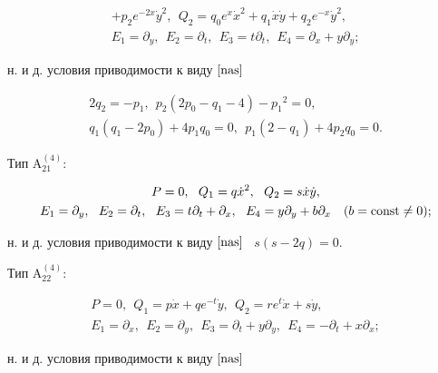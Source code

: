 \begin{thms}
\begin{gather*}
+p_2 e^{-2x}\Dot y^2,\ \ 


Q_2=q_0e^x\Dot x^2+ q_1\Dot x\Dot y+q_2 e^{-x}\Dot y^2,\\ 


E_1=\partial_y,\ \ E_2=\partial_ t,\ \ E_3=t\partial_t,


\ \ E_4=\partial_x+y\partial_y;


\end{gather*}


н. и д. условия приводимости к виду $\eqref{nas}$


\begin{gather*}


2{ q_2} = - { p_1},\ \


{ p_2}(2{ p_0} -{ q_1} - 4) -{ p_1}^{2}=0,\\


q_1(q_1-2p_0)+4p_1q_0=0,\ \ { p_1}(2-{ q_1}) + 4{ p_2}{ q_0} =0.


\end{gather*}





Тип $\mathrm{A^{(4)}_{21}}{:}$


\begin{gather*}


P=0,\ \ Q_1=q\Dot x^2,\ \  Q_2=s\Dot x\Dot y,\\


E_1=\partial_y,\ \ E_2=\partial_ t,\ \ E_3=t\partial_t+\partial_x,


\ \ E_4=y\partial_y+b\partial_x\quad (b=\const\neq 0);


\end{gather*}


н. и д. условия приводимости к виду $\eqref{nas}$ \ $s(s-2q)=0$.





Тип $\mathrm{A^{(4)}_{22}}{:}$


\begin{gather*}


P=0,\ \ Q_1=p\Dot x+qe^{-t}\Dot y,\ \ Q_2=re^{t}\Dot x+s\Dot y,\\


E_1=\partial_x,\ \ E_2=\partial_ y,\ \ E_3=\partial_t+y\partial_y,


\ \ E_4=-\partial_t+x\partial_x;


\end{gather*}


н. и д. условия приводимости к виду $\eqref{nas}$



\end{thms}
